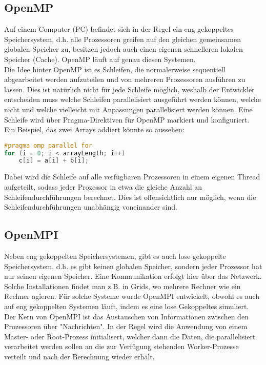 \subsection{OpenMP}
Auf einem Computer (PC) befindet sich in der Regel ein eng gekoppeltes Speichersystem, d.h. alle Prozessoren greifen auf den gleichen gemeinsamen globalen Speicher zu, besitzen jedoch auch einen eigenen schnelleren lokalen Speicher (Cache). OpenMP läuft auf genau diesen Systemen.\\
Die Idee hinter OpenMP ist es Schleifen, die normalerweise sequentiell abgearbeitet werden aufzuteilen und von mehreren Prozessoren ausführen zu lassen. Dies ist natürlich nicht für jede Schleife möglich, weshalb der Entwickler entscheiden muss welche Schleifen parallelisiert ausgeführt werden können, welche nicht und welche vielleicht mit Anpassungen parallelisiert werden können. Eine Schleife wird über Pragma-Direktiven für OpenMP markiert und konfiguriert. Ein Beispiel, das zwei Arrays addiert könnte so aussehen:

\begin{lstlisting}[language=C]
#pragma omp parallel for
for (i = 0; i < arrayLength; i++)
    c[i] = a[i] + b[i];
\end{lstlisting}

Dabei wird die Schleife auf alle verfügbaren Prozessoren in einem eigenen Thread aufgeteilt, sodass jeder Prozessor in etwa die gleiche Anzahl an Schleifendurchführungen berechnet. Dies ist offensichtlich nur möglich, wenn die Schleifendurchführungen unabhängig voneinander sind.

\subsection{OpenMPI}
Neben eng gekoppelten Speichersystemen, gibt es auch lose gekoppelte Speichersystem, d.h. es gibt keinen globalen Speicher, sondern jeder Prozessor hat nur seinen eigenen Speicher. Eine Kommunikation erfolgt hier über das Netzwerk. Solche Installationen findet man z.B. in Grids, wo mehrere Rechner wie ein Rechner agieren. Für solche Systeme wurde OpenMPI entwickelt, obwohl es auch auf eng gekoppelten Systemen läuft, indem es eine lose Gekoppeltes simuliert.\\
Der Kern von OpenMPI ist das Austauschen von Informationen zwischen den Prozessoren über "Nachrichten". In der Regel wird die Anwendung von einem Master- oder Root-Prozess initialisert, welcher dann die Daten, die parallelisiert verarbeitet werden sollen an die zur Verfügung stehenden Worker-Prozesse verteilt und nach der Berechnung wieder erhält.
